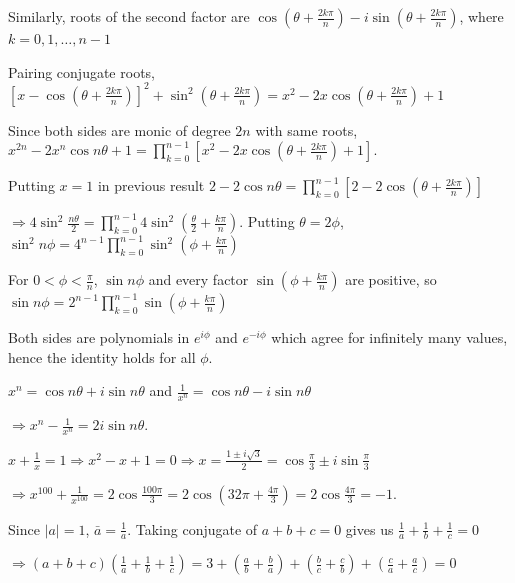   Similarly, roots of the second factor are $\cos\left(\theta + \frac{2k\pi}{n}\right) - i\sin\left(\theta
  + \frac{2k\pi}{n}\right)$, where $k = 0, 1, \ldots, n - 1$

  Pairing conjugate roots, $\left[x - \cos\left(\theta + \frac{2k\pi}{n}\right)\right]^2 + \sin^2\left(\theta
  + \frac{2k\pi}{n}\right) = x^2 - 2x\cos\left(\theta + \frac{2k\pi}{n}\right) + 1$

  Since both sides are monic of degree $2n$ with same roots, $x^{2n} - 2x^n\cos n\theta + 1 = \prod_{k =
    0}^{n - 1}\left[x^2 - 2x\cos\left(\theta + \frac{2k\pi}{n}\right) + 1\right]$.
\item Putting $x = 1$ in previous result $2 - 2\cos n\theta = \prod_{k = 0}^{n - 1}\left[2 - 2\cos\left(\theta
    + \frac{2k\pi}{n}\right)\right]$

  $\Rightarrow 4\sin^2\frac{n\theta}{2} = \prod_{k = 0}^{n - 1}4\sin^2\left(\frac{\theta}{2} +
  \frac{k\pi}{n}\right)$. Putting $\theta = 2\phi$, $\sin^2n\phi = 4^{n - 1}\prod_{k = 0}^{n -
    1}\sin^2\left(\phi + \frac{k\pi}{n}\right)$

  For $0 < \phi < \frac{\pi}{n}$, $\sin n\phi$ and every factor $\sin\left(\phi + \frac{k\pi}{n}\right)$
  are positive, so $\sin n\phi = 2^{n - 1}\prod_{k = 0}^{n - 1}\sin\left(\phi + \frac{k\pi}{n}\right)$

  Both sides are polynomials in $e^{i\phi}$ and $e^{-i\phi}$ which agree for infinitely many values, hence the
  identity holds for all $\phi$.
\item $x^n = \cos n\theta + i\sin n\theta$ and $\frac{1}{x^n} = \cos n\theta - i\sin n\theta$

  $\Rightarrow x^n - \frac{1}{x^n} = 2i\sin n\theta$.
\item $x + \frac{1}{x} = 1 \Rightarrow x^2 - x + 1 = 0 \Rightarrow x = \frac{1\pm i\sqrt{3}}{2} =
  \cos\frac{\pi}{3}\pm i\sin\frac{\pi}{3}$

  $\Rightarrow x^{100} + \frac{1}{x^{100}} = 2\cos\frac{100\pi}{3} = 2\cos\left(32\pi + \frac{4\pi}{3}\right)
  = 2\cos\frac{4\pi}{3} = -1$.
\item Since $|a| = 1$, $\bar{a} = \frac{1}{a}$. Taking conjugate of $a + b + c = 0$ gives us $\frac{1}{a} +
  \frac{1}{b} + \frac{1}{c} = 0$

  $\Rightarrow (a + b + c)\left(\frac{1}{a} + \frac{1}{b} + \frac{1}{c}\right) = 3 + \left(\frac{a}{b} +
  \frac{b}{a}\right) + \left(\frac{b}{c} + \frac{c}{b}\right) + \left(\frac{c}{a} + \frac{a}{c}\right) = 0$

